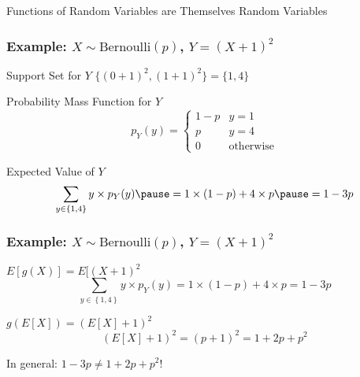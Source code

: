\begin{frame}
\begin{center}
\Huge Functions of Random Variables are Themselves Random Variables
\end{center}

\end{frame}
\begin{frame}
  \frametitle{Example: $X\sim \mbox{Bernoulli}(p)$, $Y = (X+1)^2$}

\begin{block}{Support Set for $Y$} \pause
$\{(0 + 1)^2, (1 + 1)^2\} =\{1, 4\}$
\end{block}

\begin{block}{Probability Mass Function for $Y$} \pause
	$$p_Y(y) = \left\{\begin{array}{ll} 1-p& y = 1\\ p& y = 4\\ 0& \mbox{otherwise}\end{array}\right.$$
\end{block}

\pause
\begin{block}{Expected Value of $Y$}
  \[
    \sum_{y\in \left\{ 1,4 \right\}} y \times p_Y(y) \pause = 1 \times (1 - p )  + 4 \times p \pause = 1 - 3p
  \]
\end{block}

\end{frame}
\begin{frame}
  \frametitle{Example: $X\sim \mbox{Bernoulli}(p)$, $Y = (X+1)^2$}


  \begin{block}{$E[g(X)] = E[(X+1)^2$}
  \[
    \sum_{y\in \left\{ 1,4 \right\}} y \times p_Y(y)  = 1 \times (1 - p )  + 4 \times p  = 1 - 3p
  \]
\end{block}

\pause

\begin{block}{$g(E[X]) = (E[X] + 1)^2$}
  \[\left(E[X] + 1\right)^2 = (p + 1)^2 = 1 + 2p + p^2\]
\end{block}

\pause

\begin{alertblock}{In general: $1 - 3p \neq 1 + 2p + p^2$!}
\end{alertblock}

\end{frame}


